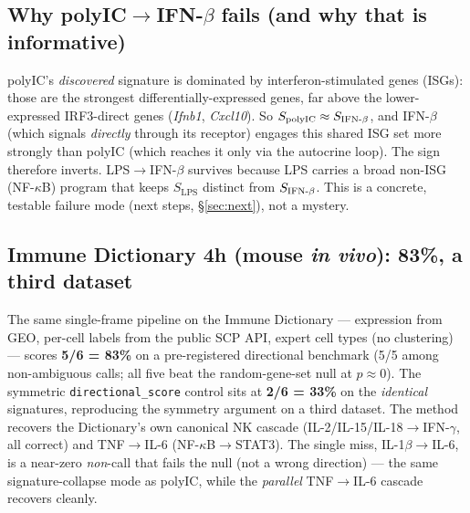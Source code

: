 \documentclass[11pt]{article}
\newcommand{\code}[1]{\texttt{\small #1}}
\newcommand{\dscore}{\code{directional\_score}}
\newcommand{\ifnb}{\textnormal{IFN-}\ensuremath{\beta}}
\newcommand{\nfkb}{\textnormal{NF-}\ensuremath{\kappa}\textnormal{B}}
\begin{document}
\subsection{Why polyIC$\to$\ifnb{} fails (and why that is informative)}
polyIC's \emph{discovered} signature is dominated by interferon-stimulated genes
(ISGs): those are the strongest differentially-expressed genes, far above the
lower-expressed IRF3-direct genes (\emph{Ifnb1}, \emph{Cxcl10}). So
$S_{\text{polyIC}}\approx S_{\ifnb}$, and \ifnb{} (which signals \emph{directly}
through its receptor) engages this shared ISG set more strongly than polyIC (which
reaches it only via the autocrine loop). The sign therefore inverts. LPS$\to$\ifnb{}
survives because LPS carries a broad non-ISG (\nfkb{}) program that keeps
$S_{\text{LPS}}$ distinct from $S_{\ifnb}$. This is a concrete, testable failure
mode (next steps, §\ref{sec:next}), not a mystery.

\subsection{Immune Dictionary 4h (mouse \emph{in vivo}): 83\%, a third dataset}
The same single-frame pipeline on the Immune Dictionary --- expression from GEO,
per-cell labels from the public SCP API, expert cell types (no clustering) ---
scores \textbf{5/6 = 83\%} on a pre-registered directional benchmark (5/5 among
non-ambiguous calls; all five beat the random-gene-set null at $p\approx0$). The
symmetric \dscore{} control sits at \textbf{2/6 = 33\%} on the \emph{identical}
signatures, reproducing the symmetry argument on a third dataset. The method
recovers the Dictionary's own canonical NK cascade
(IL-2/IL-15/IL-18$\to$IFN-$\gamma$, all correct) and TNF$\to$IL-6 (\nfkb$\to$STAT3).
The single miss, IL-1$\beta\to$IL-6, is a near-zero \emph{non}-call that fails the
null (not a wrong direction) --- the same signature-collapse mode as polyIC, while
the \emph{parallel} TNF$\to$IL-6 cascade recovers cleanly.

\end{document}
